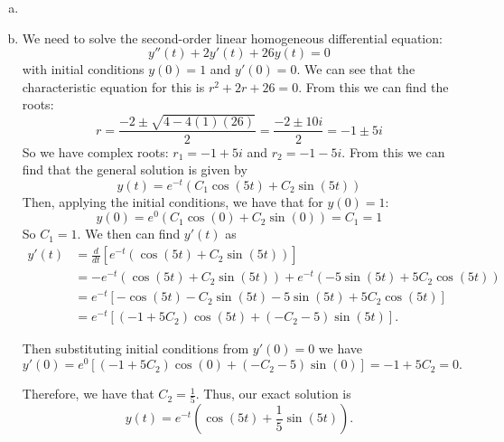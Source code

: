 \documentclass{article}
\begin{document}
\begin{enumerate}[(a)]
    \item 

        \item We need to solve the second-order linear homogeneous differential equation:
            $$y''(t) + 2y'(t) + 26y(t) = 0$$
            with initial conditions $y(0) = 1$ and $y'(0) = 0$.
            We can see that the characteristic equation for this is $r^2 + 2r + 26 = 0$. From this we can find the roots:
            $$r = \frac{-2 \pm \sqrt{4 - 4(1)(26)}}{2} = \frac{-2 \pm 10i}{2} = -1 \pm 5i$$
            So we have complex roots: $r_1 = -1 + 5i$ and $r_2 = -1 - 5i$. From this we can find that the general solution is given by
            $$y(t) = e^{-t}(C_1 \cos(5t) + C_2 \sin(5t))$$
            Then, applying the initial conditions, we have that for $y(0) = 1$:
            $$y(0) = e^{0}(C_1 \cos(0) + C_2 \sin(0)) = C_1 = 1$$
            So $C_1 = 1$.
            We then can find $y'(t)$ as 
            \begin{align*}
                y'(t) &= \frac{d}{dt}[e^{-t}(\cos(5t) + C_2 \sin(5t))] \\
                &= -e^{-t}(\cos(5t) + C_2 \sin(5t)) + e^{-t}(-5\sin(5t) + 5C_2 \cos(5t)) \\
                &= e^{-t}[-\cos(5t) - C_2 \sin(5t) - 5\sin(5t) + 5C_2 \cos(5t)] \\
                &= e^{-t}[(-1 + 5C_2)\cos(5t) + (-C_2 - 5)\sin(5t)].
            \end{align*}

            Then substituting initial conditions from $y'(0) = 0$ we have
            $$y'(0) = e^{0}[(-1 + 5C_2)\cos(0) + (-C_2 - 5)\sin(0)] = -1 + 5C_2 = 0.$$

            Therefore, we have that $C_2 = \frac{1}{5}$. Thus, our exact solution is
            $$y(t) = e^{-t}\left(\cos(5t) + \frac{1}{5}\sin(5t)\right).$$
\end{enumerate}
\end{document}
